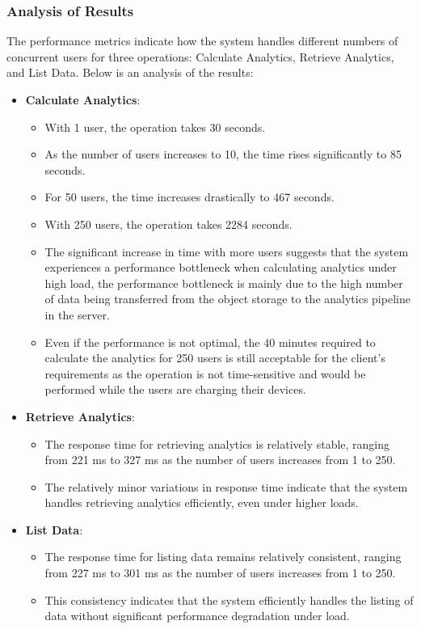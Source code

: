 \subsubsection{Analysis of Results}
The performance metrics indicate how the system handles different numbers of concurrent users for three operations: Calculate Analytics, Retrieve Analytics, and List Data. Below is an analysis of the results:

\begin{itemize}
\item \textbf{Calculate Analytics}:
    \begin{itemize}
    \item With 1 user, the operation takes 30 seconds.
    \item As the number of users increases to 10, the time rises significantly to 85 seconds.
    \item For 50 users, the time increases drastically to 467 seconds.
    \item With 250 users, the operation takes 2284 seconds.
    \item The significant increase in time with more users suggests that the system experiences a performance bottleneck when calculating analytics under high load, the performance bottleneck is mainly due to the high number of data being transferred from the object storage to the analytics pipeline in the server.
    \item Even if the performance is not optimal, the 40 minutes required to calculate the analytics for 250 users is still acceptable for the client's requirements as the operation is not time-sensitive and would be performed while the users are charging their devices.
    \end{itemize}

\item \textbf{Retrieve Analytics}:
    \begin{itemize}
        \item The response time for retrieving analytics is relatively stable, ranging from 221 ms to 327 ms as the number of users increases from 1 to 250.
        \item The relatively minor variations in response time indicate that the system handles retrieving analytics efficiently, even under higher loads.
    \end{itemize}

\item \textbf{List Data}:
    \begin{itemize}
        \item The response time for listing data remains relatively consistent, ranging from 227 ms to 301 ms as the number of users increases from 1 to 250.
        \item This consistency indicates that the system efficiently handles the listing of data without significant performance degradation under load.
    \end{itemize}
\end{itemize}

